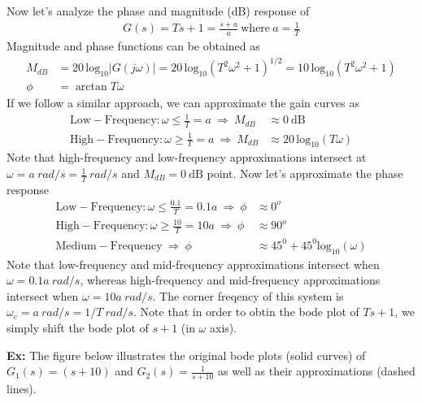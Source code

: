 \documentclass[twoside]{article}
\begin{document}
Now let's analyze the phase and magnitude (dB) response of 
%
\begin{align*}
  G(s) = T s + 1 = \frac{s + a}{a} \ \mathrm{where} \ a = \frac{1}{T}
\end{align*}
%
Magnitude and phase functions can be obtained as
\begin{align*}
  M_{dB}  &= 20 \, \mathrm{log}_{10} | G( j \omega) | = 20 \, \mathrm{log}_{10} \left( T^2 \omega^2 + 1 \right)^{1/2} = 10 \, \mathrm{log}_{10} \left( T^2 \omega^2 + 1 \right)
  \\
  \phi &= \arctan T \omega                                    
\end{align*}
%
If we follow a similar approach, we can approximate the gain curves as
%
\begin{align*}
  \mathrm{Low-Frequency}: \omega \leq \frac{1}{T} = a  \ \Rightarrow \ M_{dB}  &\approx 0 \ \mathrm{dB} \\
  \mathrm{High-Frequency}: \omega \geq \frac{1}{T} = a \ \Rightarrow \ M_{dB}  &\approx 20 \, \mathrm{log}_{10} ( T \omega )
\end{align*}
%
Note that high-frequency and low-frequency approximations intersect at
$\omega = a \ rad/s = \frac{1}{T} \ rad/s$ and $M_{dB} = 0 \ \mathrm{dB}$ point. Now 
let's approximate the phase response
%
\begin{align*}
  \mathrm{Low-Frequency}: \omega \leq \frac{0.1}{T} = 0.1 a \ \Rightarrow \ \phi  &\approx 0^o  \\
  \mathrm{High-Frequency}: \omega \geq \frac{10}{T} = 10 a  \ \Rightarrow \ \phi &\approx 90^o \\
  \mathrm{Medium-Frequency} \ \Rightarrow \ \phi & \approx 45^0 + 45^0 \mathrm{log}_{10} ( \omega)
\end{align*}
%
Note that low-frequency and mid-frequency approximations intersect
when $\omega = 0.1 a \ rad/s$,
whereas high-frequency and mid-frequency approximations intersect when
$\omega = 10 a \ rad/s$.
The corner freqency of this system is $\omega_c = a \ rad/s = 1/T \
rad/s$. Note that in order to obtin the bode plot of $T s + 1$, we
simply shift the bode plot of $s + 1$ (in $\omega$ axis). 

\vspace{6pt}

\textbf{Ex:} The figure below
illustrates the original bode plots (solid curves) of $G_1(s) = (s+10)$ and $G_2(s) = \frac{1}{s+10}$ as well as
their approximations (dashed lines). 

\vspace{6 pt}
\end{document}
